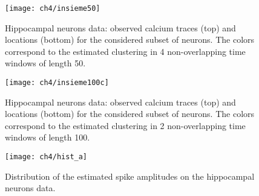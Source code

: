 \clearpage
\begin{figure}
	\centerline{
		\texttt{[image: ch4/insieme50]}
	}
	\caption[Estimated clustering on the hippocampal neurons data using 4 time windows of length 50.]{Hippocampal neurons data: observed calcium traces (top) and locations (bottom) for the considered subset of neurons. The colors correspond to the estimated clustering in 4 non-overlapping time windows of length 50. \label{ch4:fig_real50}}
\end{figure}


\begin{figure}
	\centerline{
		\texttt{[image: ch4/insieme100c]}
	}
	\caption[Estimated clustering on the hippocampal neurons data using 2 time windows of length 100.]{Hippocampal neurons data: observed calcium traces (top) and locations (bottom) for the considered subset of neurons. The colors correspond to the estimated clustering in 2 non-overlapping time windows of length 100. \label{ch4:fig_real100}}
\end{figure}


\begin{figure}
	\centering
	\texttt{[image: ch4/hist\_a]}
	\caption{Distribution of the estimated spike amplitudes on the hippocampal neurons data. \label{ch4:hist_a}}
\end{figure}




